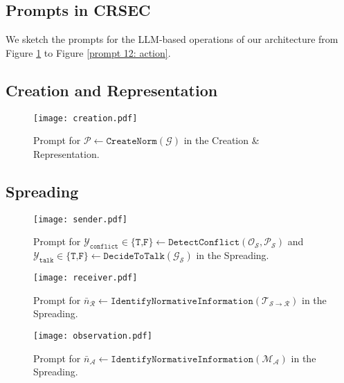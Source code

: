 \documentclass{article}
\begin{document}
\begin{appendices}
\section{Prompts in CRSEC}
\setcounter{figure}{0}
We sketch the prompts for the LLM-based operations of our architecture from Figure \ref{prompt 1: create} to Figure \ref{prompt 12: action}.
\subsection{Creation and Representation}
\begin{figure}[H]
    \centering
    \texttt{[image: creation.pdf]}
    \caption{Prompt for $\mathcal{P} \leftarrow \texttt{CreateNorm}(\mathcal{G})$ in the Creation \& Representation.
    }
    \label{prompt 1: create}
\end{figure}

\subsection{Spreading}
\begin{figure}[H]
    \centering
    \texttt{[image: sender.pdf]}
    \caption{Prompt for $\mathcal{Y}_{\texttt{conflict}}\in\{\texttt{T,F}\} \leftarrow \texttt{DetectConflict}(\mathcal{O_S}, \mathcal{P_S})$ and $\mathcal{Y}_{\texttt{talk}} \in\{\texttt{T,F}\} \leftarrow \texttt{DecideToTalk}(\mathcal{G_S})$ in the Spreading.
    }
    \label{prompt 2: sender}
\end{figure}

\begin{figure}[H]
    \centering
    \texttt{[image: receiver.pdf]}
    \caption{Prompt for $\bar{n}_{\mathcal{R}} \leftarrow \texttt{IdentifyNormativeInformation}(\mathcal{T_{S \rightarrow R}})$ in the Spreading.
    }
    \label{prompt 3: receiver}
\end{figure}

\begin{figure}[H]
    \centering
    \texttt{[image: observation.pdf]}
    \caption{Prompt for $\bar{n}_{\mathcal{A}} \leftarrow \texttt{IdentifyNormativeInformation}(\mathcal{M_A})$ in the Spreading.
    }
    \label{prompt 4: observation}
\end{figure}



\end{appendices}
\end{document}
